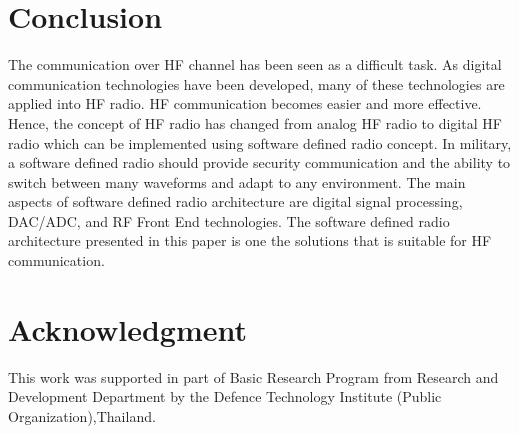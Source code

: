 \documentclass[conference]{IEEEtran}
\begin{document}



\section{Conclusion}
The communication over HF channel has been seen as a difficult task. As digital communication technologies have been developed, many of these technologies are applied into HF radio. HF communication becomes easier and more effective. Hence, the concept of HF radio has changed from analog HF radio to digital HF radio which can be implemented using software defined radio concept. In military, a software defined radio should provide security communication and the ability to switch between many waveforms and adapt to any environment. The main aspects of software defined radio architecture are digital signal processing, DAC/ADC, and RF Front End technologies. The software defined radio architecture presented in this paper is one the solutions that is suitable for HF communication. 




\section*{Acknowledgment}
This work was supported in part of Basic Research
Program from Research and Development Department by the
Defence Technology Institute (Public Organization),Thailand.



\end{document}
